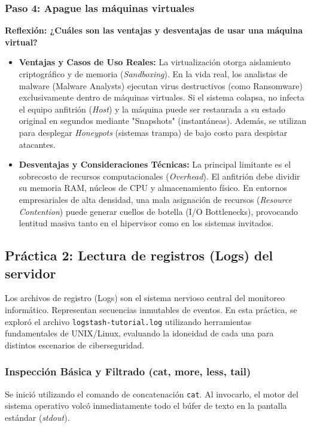 \documentclass[12pt,a4paper]{article}
\begin{document}
\subsubsection*{Paso 4: Apague las máquinas virtuales}

\textbf{Reflexión: ¿Cuáles son las ventajas y desventajas de usar una máquina virtual?}
\begin{itemize}
    \item \textbf{Ventajas y Casos de Uso Reales:} La virtualización otorga aislamiento criptográfico y de memoria (\textit{Sandboxing}). En la vida real, los analistas de malware (Malware Analysts) ejecutan virus destructivos (como Ransomware) exclusivamente dentro de máquinas virtuales. Si el sistema colapsa, no infecta el equipo anfitrión (\textit{Host}) y la máquina puede ser restaurada a su estado original en segundos mediante "Snapshots" (instantáneas). Además, se utilizan para desplegar \textit{Honeypots} (sistemas trampa) de bajo costo para despistar atacantes.
    \item \textbf{Desventajas y Consideraciones Técnicas:} La principal limitante es el sobrecosto de recursos computacionales (\textit{Overhead}). El anfitrión debe dividir su memoria RAM, núcleos de CPU y almacenamiento físico. En entornos empresariales de alta densidad, una mala asignación de recursos (\textit{Resource Contention}) puede generar cuellos de botella (I/O Bottlenecks), provocando lentitud masiva tanto en el hipervisor como en los sistemas invitados.
\end{itemize}

\subsection{Práctica 2: Lectura de registros (Logs) del servidor}

Los archivos de registro (Logs) son el sistema nervioso central del monitoreo informático. Representan secuencias inmutables de eventos. En esta práctica, se exploró el archivo \texttt{logstash-tutorial.log} utilizando herramientas fundamentales de UNIX/Linux, evaluando la idoneidad de cada una para distintos escenarios de ciberseguridad.

\subsubsection{Inspección Básica y Filtrado (cat, more, less, tail)}

Se inició utilizando el comando de concatenación \texttt{cat}. Al invocarlo, el motor del sistema operativo volcó inmediatamente todo el búfer de texto en la pantalla estándar (\textit{stdout}).
\end{document}

